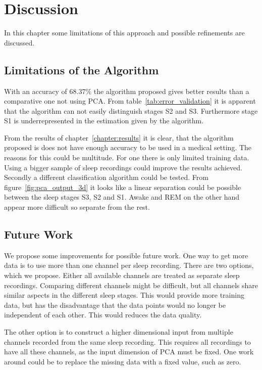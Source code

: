 \chapter{Discussion}
\label{chapter:discussion}

In this chapter some limitations of this approach and possible refinements are discussed.

\section{Limitations of the Algorithm}

With an accuracy of $68.37\%$ the algorithm proposed gives better results than a comparative one not using PCA. From table~\ref{tab:error_validation} it is apparent that the algorithm can not easily distinguish stages S2 and S3. Furthermore stage S1 is underrepresented in the estimation given by the algorithm.

From the results of chapter~\ref{chapter:results} it is clear, that the algorithm proposed is does not have enough accuracy to be used in a medical setting. The reasons for this could be multitude. For one there is only limited training data. Using a bigger sample of sleep recordings could improve the results achieved. Secondly a different classification algorithm could be tested. From figure~\ref{fig:pca_output_3d} it looks like a linear separation could be possible between the sleep stages S3, S2 and S1. Awake and REM on the other hand appear more difficult so separate from the rest.

\section{Future Work}
We propose some improvements for possible future work. One way to get more data is to use more than one channel per sleep recording. There are two options, which we propose. Either all available channels are treated as separate sleep recordings. Comparing different channels might be difficult, but all channels share similar aspects in the different sleep stages. This would provide more training data, but has the disadvantage that the data points would no longer be independent of each other. This would reduces the data quality.

The other option is to construct a higher dimensional input from multiple channels recorded from the same sleep recording. This requires all recordings to have all these channels, as the input dimension of PCA must be fixed. One work around could be to replace the missing data with a fixed value, such as zero.

